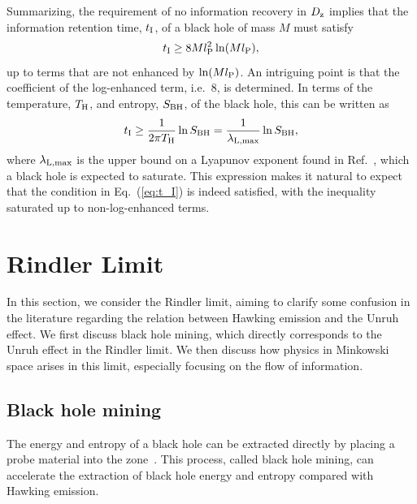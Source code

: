 \documentclass[12pt]{article}
\begin{document}
Summarizing, the requirement of no information recovery in 
$D_{\rm z}$ implies that the information retention time, 
$t_{\rm I}$, of a black hole of mass $M$ must satisfy
%
\begin{equation}
  t_{\rm I} \geq 8Ml_{\rm P}^2 \ln(Ml_{\rm P}),
\label{eq:t_I}
\end{equation}
%
up to terms that are not enhanced by $\ln(Ml_{\rm P})$.  An 
intriguing point is that the coefficient of the log-enhanced 
term, i.e.\ $8$, is determined.  In terms of the temperature, 
$T_{\rm H}$, and entropy, $S_{\rm BH}$, of the black hole, this 
can be written as
%
\begin{equation}
  t_{\rm I} \geq \frac{1}{2\pi T_{\rm H}} \ln S_{\rm BH} 
  = \frac{1}{\lambda_{\rm L, max}} \ln S_{\rm BH},
\label{eq:t_I-2}
\end{equation}
%
where $\lambda_{\rm L, max}$ is the upper bound on a Lyapunov 
exponent found in Ref.~\cite{Maldacena:2015waa}, which a black hole 
is expected to saturate.  This expression makes it natural to expect 
that the condition in Eq.~(\ref{eq:t_I}) is indeed satisfied, with 
the inequality saturated up to non-log-enhanced terms.


\section{Rindler Limit}
\label{sec:Rindler}

In this section, we consider the Rindler limit, aiming to clarify 
some confusion in the literature regarding the relation between 
Hawking emission and the Unruh effect.  We first discuss black 
hole mining, which directly corresponds to the Unruh effect in 
the Rindler limit.  We then discuss how physics in Minkowski space 
arises in this limit, especially focusing on the flow of information.


\subsection{Black hole mining}
\label{subsec:mining}

The energy and entropy of a black hole can be extracted directly 
by placing a probe material into the zone~\cite{Unruh:1982ic,%
Brown:2012un}.  This process, called black hole mining, can 
accelerate the extraction of black hole energy and entropy 
compared with Hawking emission.
\end{document}
